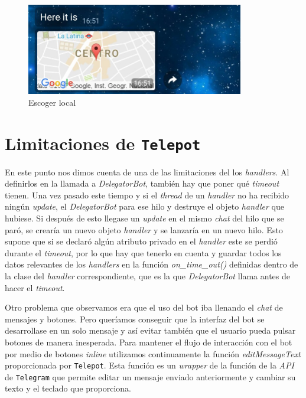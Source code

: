 \documentclass[oneside]{memoir}
\begin{document}
\begin{figure}[h!]
  \centering
  \includegraphics[height=40mm]{paso3v1.jpg}
  \caption{Escoger local}
  \label{fig:Paso3v1}
\end{figure}

\section{Limitaciones de \texttt{Telepot}}
En este punto nos dimos cuenta de una de las limitaciones del los \textit{handlers}. Al definirlos en la llamada a \textit{DelegatorBot}, también hay que poner qué \textit{timeout} tienen. Una vez pasado este tiempo y si el \textit{thread} de un \textit{handler} no ha recibido ningún \textit{update}, el \textit{DelegatorBot} para ese hilo y destruye el objeto \textit{handler} que hubiese. Si después de esto llegase un \textit{update} en el mismo \textit{chat} del hilo que se paró, se crearía un nuevo objeto \textit{handler} y se lanzaría en un nuevo hilo. Esto supone que si se declaró algún atributo privado en el \textit{handler} este se perdió durante el \textit{timeout}, por lo que hay que tenerlo en cuenta y guardar todos los datos relevantes de los \textit{handlers} en la función \textit{on\_time\_out()} definidas dentro de la clase del \textit{handler} correspondiente, que es la que \textit{DelegatorBot} llama antes de hacer el \textit{timeout}.

Otro problema que observamos era que el uso del bot iba llenando el \textit{chat} de mensajes y botones. Pero queríamos conseguir que la interfaz del bot se desarrollase en un solo mensaje y así evitar también que el usuario pueda pulsar botones de manera inesperada. Para mantener el flujo de interacción con el bot por medio de botones \textit{inline} utilizamos continuamente la función \textit{editMessageText} proporcionada por \texttt{Telepot}. Esta función es un \textit{wrapper} de la función de la \textit{API} de \texttt{Telegram} que permite editar un mensaje enviado anteriormente y cambiar su texto y el teclado que proporciona.

\end{document}

